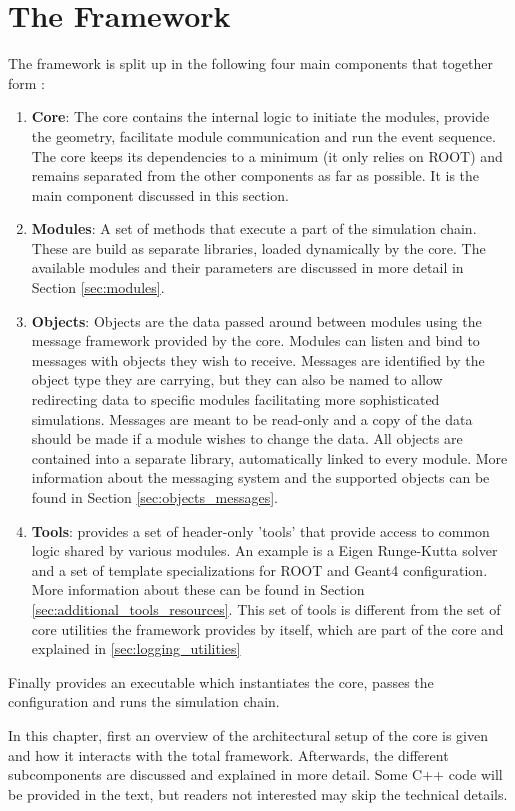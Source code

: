 \section{The \apsq Framework}
\label{sec:framework}
The framework is split up in the following four main components that together form \apsq:
\begin{enumerate}
\item \textbf{Core}: The core contains the internal logic to initiate the modules, provide the geometry, facilitate module communication and run the event sequence. The core keeps its dependencies to a minimum (it only relies on ROOT) and remains separated from the other components as far as possible. It is the main component discussed in this section.
\item \textbf{Modules}: A set of methods that execute a part of the simulation chain. These are build as separate libraries, loaded dynamically by the core. The available modules and their parameters are discussed in more detail in Section \ref{sec:modules}.
\item \textbf{Objects}: Objects are the data passed around between modules using the message framework provided by the core. Modules can listen and bind to messages with objects they wish to receive. Messages are identified by the object type they are carrying, but they can also be named to allow redirecting data to specific modules facilitating more sophisticated simulations. Messages are meant to be read-only and a copy of the data should be made if a module wishes to change the data. All objects are contained into a separate library, automatically linked to every module. More information about the messaging system and the supported objects can be found in Section \ref{sec:objects_messages}.
\item \textbf{Tools}: \apsq provides a set of header-only 'tools' that provide access to common logic shared by various modules. An example is a Eigen Runge-Kutta solver and a set of template specializations for ROOT and Geant4 configuration. More information about these can be found in Section \ref{sec:additional_tools_resources}. This set of tools is different from the set of core utilities the framework provides by itself, which are part of the core and explained in \ref{sec:logging_utilities}
\end{enumerate}
Finally \apsq provides an executable which instantiates the core, passes the configuration and runs the simulation chain.

In this chapter, first an overview of the architectural setup of the core is given and how it interacts with the total \apsq framework. Afterwards, the different subcomponents are discussed and explained in more detail. Some C++ code will be provided in the text, but readers not interested may skip the technical details.

